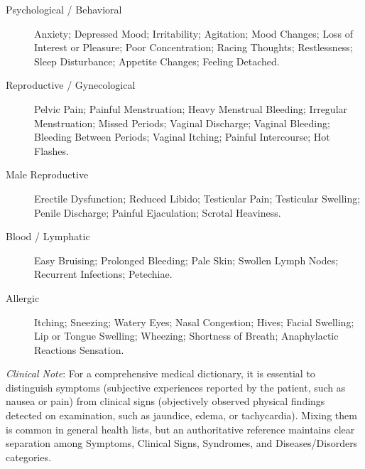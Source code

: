 \begin{description}
\item[Psychological / Behavioral] Anxiety; Depressed Mood; Irritability; Agitation; Mood Changes; Loss of Interest or Pleasure; Poor Concentration; Racing Thoughts; Restlessness; Sleep Disturbance; Appetite Changes; Feeling Detached.

\item[Reproductive / Gynecological] Pelvic Pain; Painful Menstruation; Heavy Menstrual Bleeding; Irregular Menstruation; Missed Periods; Vaginal Discharge; Vaginal Bleeding; Bleeding Between Periods; Vaginal Itching; Painful Intercourse; Hot Flashes.

\item[Male Reproductive] Erectile Dysfunction; Reduced Libido; Testicular Pain; Testicular Swelling; Penile Discharge; Painful Ejaculation; Scrotal Heaviness.

\item[Blood / Lymphatic] Easy Bruising; Prolonged Bleeding; Pale Skin; Swollen Lymph Nodes; Recurrent Infections; Petechiae.

\item[Allergic] Itching; Sneezing; Watery Eyes; Nasal Congestion; Hives; Facial Swelling; Lip or Tongue Swelling; Wheezing; Shortness of Breath; Anaphylactic Reactions Sensation.
\end{description}

\medskip
\noindent\textit{Clinical Note}: For a comprehensive medical dictionary, it is essential to distinguish symptoms (subjective experiences reported by the patient, such as nausea or pain) from clinical signs (objectively observed physical findings detected on examination, such as jaundice, edema, or tachycardia). Mixing them is common in general health lists, but an authoritative reference maintains clear separation among Symptoms, Clinical Signs, Syndromes, and Diseases/Disorders categories.
